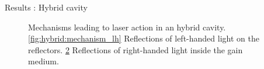 \documentclass[aspectratio=169]{beamer}
\begin{document}
\begin{frame}{Results : Hybrid cavity}
\begin{figure}
\begin{subfigure}{0.48\linewidth}
			\caption{}
			\label{fig:hybrid:mechanism_rh}
		\end{subfigure}
		\caption[Mechanisms leading to laser action in an hybrid cavity]{Mechanisms leading to laser action in an hybrid cavity. \ref{fig:hybrid:mechanism_lh} Reflections of left-handed light on the reflectors. \ref{fig:hybrid:mechanism_rh} Reflections of right-handed light inside the gain medium.}
		
	\end{figure}
\end{frame}
\end{document}
